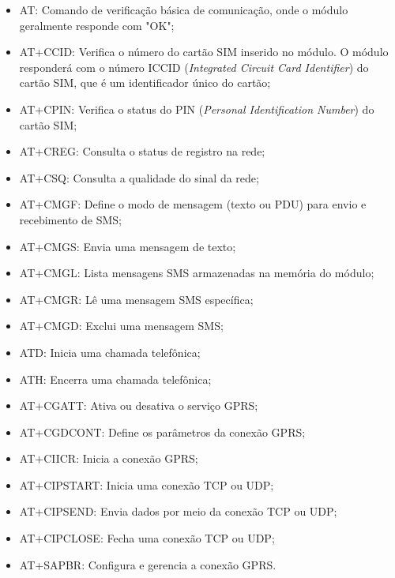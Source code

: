 \documentclass[12pt]{article}
\begin{document}
\begin{itemize}
    \item AT: Comando de verificação básica de comunicação, onde o módulo geralmente responde com "OK";
    \item AT+CCID: Verifica o número do cartão SIM inserido no módulo. O módulo responderá com o número ICCID (\textit{Integrated Circuit Card Identifier}) do cartão SIM, que é um identificador único do cartão;
    \item AT+CPIN: Verifica o status do PIN (\textit{Personal Identification Number}) do cartão SIM;
    \item AT+CREG: Consulta o status de registro na rede;
    \item AT+CSQ: Consulta a qualidade do sinal da rede;
    \item AT+CMGF: Define o modo de mensagem (texto ou PDU) para envio e recebimento de SMS;
    \item AT+CMGS: Envia uma mensagem de texto;
    \item AT+CMGL: Lista mensagens SMS armazenadas na memória do módulo;
    \item AT+CMGR: Lê uma mensagem SMS específica;
    \item AT+CMGD: Exclui uma mensagem SMS;
    \item ATD: Inicia uma chamada telefônica;
    \item ATH: Encerra uma chamada telefônica;
    \item AT+CGATT: Ativa ou desativa o serviço GPRS;
    \item AT+CGDCONT: Define os parâmetros da conexão GPRS;
    \item AT+CIICR: Inicia a conexão GPRS;
    \item AT+CIPSTART: Inicia uma conexão TCP ou UDP;
    \item AT+CIPSEND: Envia dados por meio da conexão TCP ou UDP;
    \item AT+CIPCLOSE: Fecha uma conexão TCP ou UDP;
    \item AT+SAPBR: Configura e gerencia a conexão GPRS.
\end{itemize}
\end{document}
